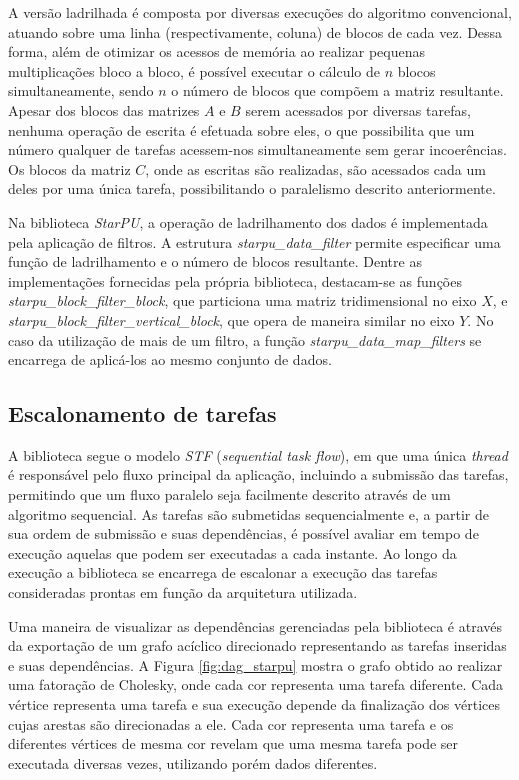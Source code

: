 \documentclass[cic,tc]{iiufrgs}
\begin{document}
A versão ladrilhada é composta por diversas execuções do algoritmo convencional, atuando sobre uma linha (respectivamente, coluna) de blocos de cada vez. Dessa forma, além de otimizar os
acessos de memória ao realizar pequenas multiplicações bloco a bloco, é possível executar o cálculo de $n$ blocos simultaneamente, sendo $n$ o número de blocos que compõem a matriz resultante.
Apesar dos blocos das matrizes $A$ e $B$ serem acessados por diversas tarefas, nenhuma operação de escrita é efetuada sobre eles, o que possibilita que um número qualquer de tarefas acessem-nos
simultaneamente sem gerar incoerências. Os blocos da matriz $C$, onde as escritas são realizadas, são acessados cada um deles por uma única tarefa, possibilitando o paralelismo descrito anteriormente.

Na biblioteca \textit{StarPU}, a operação de ladrilhamento dos dados é implementada pela aplicação de filtros. A estrutura \textit{starpu\_data\_filter} permite especificar uma função de
ladrilhamento e o número de blocos resultante. Dentre as implementações fornecidas pela própria biblioteca, destacam-se as funções \textit{starpu\_block\_filter\_block}, que particiona
uma matriz tridimensional no eixo $X$, e \textit{starpu\_block\_filter\_vertical\_block}, que opera de maneira similar no eixo $Y$. No caso da utilização de mais de um filtro, a função
\textit{starpu\_data\_map\_filters} se encarrega de aplicá-los ao mesmo conjunto de dados.

\subsection{Escalonamento de tarefas}

A biblioteca segue o modelo \textit{STF} (\textit{sequential task flow}), em que uma única \textit{thread} é responsável pelo fluxo principal da aplicação, incluindo a submissão das tarefas,
permitindo que um fluxo paralelo seja facilmente descrito através de um algoritmo sequencial. As tarefas são submetidas sequencialmente e, a partir de sua ordem de submissão e suas dependências,
é possível avaliar em tempo de execução aquelas que podem ser executadas a cada instante. Ao longo da execução a biblioteca se encarrega de escalonar a execução das tarefas consideradas prontas em função da
arquitetura utilizada.

Uma maneira de visualizar as dependências gerenciadas pela biblioteca é através da exportação de um grafo acíclico direcionado representando as tarefas inseridas e suas dependências. A Figura
\ref{fig:dag_starpu} mostra o grafo obtido ao realizar uma fatoração de Cholesky, onde cada cor representa uma tarefa diferente. Cada vértice representa uma tarefa e sua execução depende da finalização dos vértices cujas arestas são direcionadas a ele. Cada cor representa uma tarefa e os diferentes vértices de mesma cor revelam que uma mesma tarefa pode ser executada diversas vezes, utilizando porém dados diferentes. 
\end{document}

